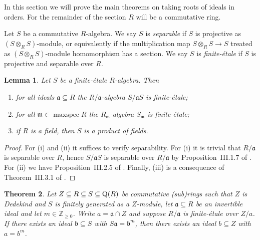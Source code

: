 \documentclass{amsart}
\theoremstyle{plain}
\newtheorem{theorem}{Theorem}[section]
\newtheorem{lemma}[theorem]{Lemma}
\theoremstyle{definition}
\DeclareMathOperator{\maxspec}{maxspec}
\newcommand{\tensor}{\otimes}
\newcommand{\Z}{\ensuremath{\mathbb{Z}}}
\begin{document}
In this section we will prove the main theorems on taking roots of ideals in orders.
For the remainder of the section \(R\) will be a commutative ring.

Let \(S\) be a commutative \(R\)-algebra. 
We say $S$ is \emph{separable} if $S$ is projective as $(S\tensor_RS)$-module, or equivalently if the multiplication map $S\tensor_R S\to S$ treated as $(S\tensor_R S)$-module homomorphism has a section.
We say \(S\) is {\em finite-\'etale} if \(S\) is projective and separable over \(R\).

\begin{lemma}
\label{lem:etale_base_change}
Let \(S\) be a finite-\'etale \(R\)-algebra. Then
\begin{enumerate}[nosep,label=\textup{(\roman*)}]
\item for all ideals \(\mathfrak{a}\subseteq R\) the \(R/\mathfrak{a}\)-algebra \(S/\mathfrak{a}S\) is finite-\'etale;
\item for all \(\mathfrak{m}\in\maxspec R\) the \(R_\mathfrak{m}\)-algebra \(S_\mathfrak{m}\) is finite-\'etale;
\item if \(R\) is a field, then \(S\) is a product of fields.
\end{enumerate}
\end{lemma}
\begin{proof}
For (i) and (ii) it suffices to verify separability.
For (i) it is trivial that \(R/\mathfrak{a}\) is separable over \(R\), hence \(S/\mathfrak{a}S\) is separable over \(R/\mathfrak{a}\) by Proposition~III.1.7 of \cite{separable}.
For (ii) we have Proposition~III.2.5 of \cite{separable}.
Finally, (iii) is a consequence of Theorem~III.3.1 of \cite{separable}.
\end{proof}

\begin{theorem}\label{thm:root_exists_condition}
Let \(Z\subseteq R\subseteq S \subseteq \textup{Q}(R)\) be commutative (sub)rings such that \(Z\) is Dedekind and \(S\) is finitely generated as a \(Z\)-module, let \(\mathfrak{a}\subseteq R\) be an invertible ideal and let \(m\in\Z_{\geq 0}\).
Write \(a=\mathfrak{a}\cap Z\) and suppose \(R/\mathfrak{a}\) is finite-\'etale over \(Z/a\).
If there exists an ideal \(\mathfrak{b}\subseteq S\) with \(S\mathfrak{a}=\mathfrak{b}^m\), then there exists an ideal \(b\subseteq Z\) with \(a=b^m\).
\end{theorem}
\end{document}

